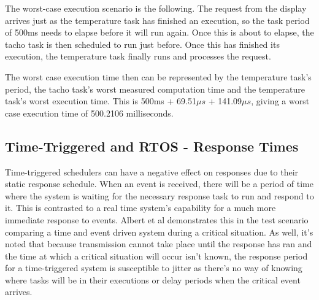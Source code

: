 \documentclass[]{report}
\begin{document}
			The worst-case execution scenario is the following. The request from the display arrives just as the temperature task has finished an execution, so the task period of 500ms needs to elapse before it will run again. Once this is about to elapse, the tacho task is then scheduled to run just before. Once this has finished its execution, the temperature task finally runs and processes the request.
			
			The worst case execution time then can be represented by the temperature task's period, the tacho task's worst measured computation time and the temperature task's worst execution time. This is 500ms + 69.51$\mu s$ + 141.09$\mu s$, giving a worst case execution time of 500.2106 milliseconds.
		
			
			
			\subsection{Time-Triggered and RTOS - Response Times}
			Time-triggered schedulers can have a negative effect on responses due to their static response schedule. When an event is received, there will be a period of time where the system is waiting for the necessary response task to run and respond to it. This is contrasted to a real time system's capability for a much more immediate response to events. Albert et al\cite{albert2004comparison} demonstrates this in the test scenario comparing a time and event driven system during a critical situation. As well, it's noted that because transmission cannot take place until the response has ran and the time at which a critical situation will occur isn't known, the response period for a time-triggered system is susceptible to jitter as there's no way of knowing where tasks will be in their executions or delay periods when the critical event arrives.
			
\end{document}
